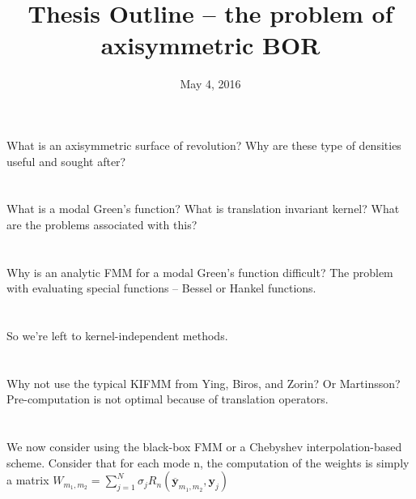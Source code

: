 \documentclass[11pt, oneside]{article}   	%
\title{Thesis Outline -- the problem of axisymmetric BOR}
\date{May 4, 2016}
\begin{document}
\maketitle

\section{}
\subsection{}
What is an axisymmetric surface of revolution? Why are these type of densities useful and sought after?
\section{}
What is a modal Green's function? What is translation invariant kernel? What are the problems associated with this?
\section{}
Why is an analytic FMM for a modal Green's function difficult? The problem with evaluating special functions -- Bessel or Hankel functions.
\section{}
So we're left to kernel-independent methods.
\section{}
Why not use the typical KIFMM from Ying, Biros, and Zorin? Or Martinsson? Pre-computation is not optimal because of translation operators.
\section{}
We now consider using the black-box FMM or a Chebyshev interpolation-based scheme. Consider that for each mode n, the computation of the weights is simply a matrix
$W_{m_1,m_2}=\sum_{j=1}^N \sigma_j R_n(\mathbf{\overline{y}}_{m_1,m_2},\mathbf{y}_j)$
\end{document}
